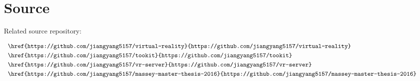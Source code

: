 \label{appendix-source} %
\chapter{Source}

Related source repository:

\[
\begin{array}{lr}
\begin{aligned}
&\code{\href{https://github.com/jiangyang5157/virtual-reality}{https://github.com/jiangyang5157/virtual-reality}}\\
&\code{\href{https://github.com/jiangyang5157/tookit}{https://github.com/jiangyang5157/tookit}}\\
&\code{\href{https://github.com/jiangyang5157/vr-server}{https://github.com/jiangyang5157/vr-server}}\\
&\code{\href{https://github.com/jiangyang5157/massey-master-thesis-2016}{https://github.com/jiangyang5157/massey-master-thesis-2016}}\\
\end{aligned}
\end{array}
\]

